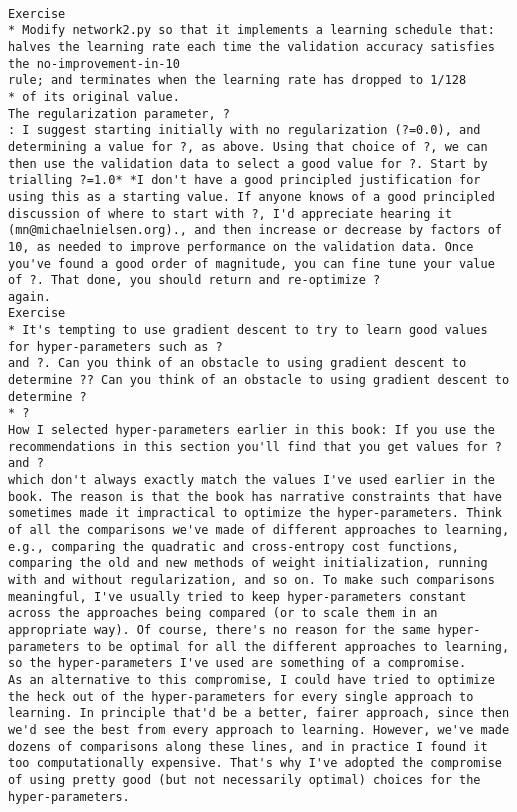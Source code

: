 \begin{lstlisting}

Exercise
* Modify network2.py so that it implements a learning schedule that: halves the learning rate each time the validation accuracy satisfies the no-improvement-in-10
rule; and terminates when the learning rate has dropped to 1/128
* of its original value. 
The regularization parameter, ?
: I suggest starting initially with no regularization (?=0.0), and determining a value for ?, as above. Using that choice of ?, we can then use the validation data to select a good value for ?. Start by trialling ?=1.0* *I don't have a good principled justification for using this as a starting value. If anyone knows of a good principled discussion of where to start with ?, I'd appreciate hearing it (mn@michaelnielsen.org)., and then increase or decrease by factors of 10, as needed to improve performance on the validation data. Once you've found a good order of magnitude, you can fine tune your value of ?. That done, you should return and re-optimize ?
again.
Exercise
* It's tempting to use gradient descent to try to learn good values for hyper-parameters such as ?
and ?. Can you think of an obstacle to using gradient descent to determine ?? Can you think of an obstacle to using gradient descent to determine ?
* ? 
How I selected hyper-parameters earlier in this book: If you use the recommendations in this section you'll find that you get values for ?
and ?
which don't always exactly match the values I've used earlier in the book. The reason is that the book has narrative constraints that have sometimes made it impractical to optimize the hyper-parameters. Think of all the comparisons we've made of different approaches to learning, e.g., comparing the quadratic and cross-entropy cost functions, comparing the old and new methods of weight initialization, running with and without regularization, and so on. To make such comparisons meaningful, I've usually tried to keep hyper-parameters constant across the approaches being compared (or to scale them in an appropriate way). Of course, there's no reason for the same hyper-parameters to be optimal for all the different approaches to learning, so the hyper-parameters I've used are something of a compromise.
As an alternative to this compromise, I could have tried to optimize the heck out of the hyper-parameters for every single approach to learning. In principle that'd be a better, fairer approach, since then we'd see the best from every approach to learning. However, we've made dozens of comparisons along these lines, and in practice I found it too computationally expensive. That's why I've adopted the compromise of using pretty good (but not necessarily optimal) choices for the hyper-parameters.

\end{lstlisting}
